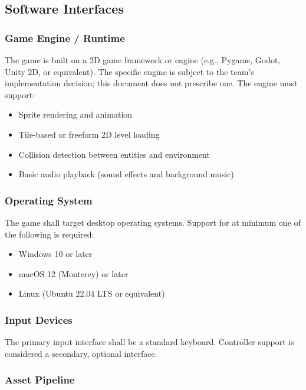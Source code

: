 \documentclass[12pt, letterpaper]{article}
\begin{document}
\subsection{Software Interfaces}

\subsubsection{Game Engine / Runtime}

The game is built on a 2D game framework or engine (e.g., Pygame, Godot, Unity 2D, or equivalent). The specific engine is subject to the team's implementation decision; this document does not prescribe one. The engine must support:

\begin{itemize}[noitemsep]
    \item Sprite rendering and animation
    \item Tile-based or freeform 2D level loading
    \item Collision detection between entities and environment
    \item Basic audio playback (sound effects and background music)
\end{itemize}

\subsubsection{Operating System}

The game shall target desktop operating systems. Support for at minimum one of the following is required:

\begin{itemize}[noitemsep]
    \item Windows 10 or later
    \item macOS 12 (Monterey) or later
    \item Linux (Ubuntu 22.04 LTS or equivalent)
\end{itemize}

\subsubsection{Input Devices}

The primary input interface shall be a standard keyboard. Controller support is considered a secondary, optional interface.

\subsubsection{Asset Pipeline}
\end{document}
